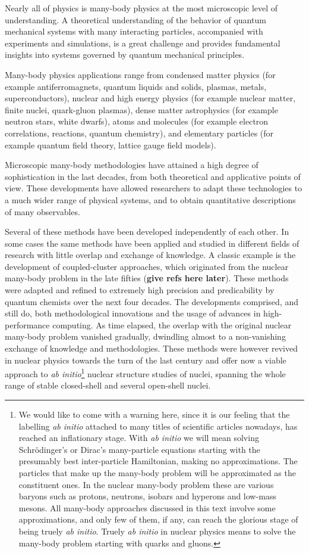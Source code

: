 
Nearly all of physics is many-body physics at the most  
microscopic level of understanding.
A theoretical understanding of the behavior of quantum mechanical systems with many interacting particles,
accompanied with experiments and simulations,   
is a  great challenge and provides fundamental insights into systems governed by quantum mechanical principles.

Many-body physics  applications range from condensed matter physics
(for example antiferromagnets, quantum liquids and solids, plasmas, metals,
superconductors), nuclear and high energy physics (for example nuclear matter, finite
nuclei, quark-gluon plasmas), dense matter astrophysics (for example  neutron
stars, white dwarfs), atoms and molecules (for example electron correlations,
reactions, quantum chemistry), and elementary particles
(for example quantum field theory, lattice gauge field models). 

Microscopic many-body methodologies have attained a high degree of
sophistication in the last decades, from both theoretical and
applicative  points of view. These developments have allowed
researchers to adapt these technologies to a much wider range of physical
systems, and to obtain quantitative descriptions of many 
observables. 

Several of these methods have been developed independently of each other.
In some  cases the same methods have been applied and studied in different
fields of research with little overlap and exchange of knowledge. 
A classic example is the development of coupled-cluster approaches,
which originated from the nuclear many-body problem in the late fifties ({\bf give refs here later}). 
These methods were adapted and refined 
to extremely high precision and predicability by quantum chemists over 
the next four decades. The developments comprised, and still do,  
both methodological innovations and the usage of advances in high-performance computing.    
As time elapsed,   
the overlap with the original nuclear many-body problem vanished gradually, 
dwindling almost to a non-vanishing exchange of knowledge and methodologies. 
These methods were however revived in nuclear physics towards the turn of the last century and offer now a viable approach
to {\em ab initio}\footnote{We would like to come with a warning here, since it is our feeling that the 
labelling {\em ab initio} attached to many titles of scientific articles nowadays, has reached an inflationary stage. 
With {\em ab initio} we will mean solving Schr\"odinger's or Dirac's many-particle equations starting with the presumably best 
inter-particle Hamiltonian, making no approximations. The particles that make up the many-body problem will be approximated 
as the constituent ones. 
In the nuclear many-body problem
these are various baryons such as protons, neutrons, isobars and hyperons and low-mass mesons. All many-body approaches discussed in this text involve
some approximations, and only few of them, if any,  can reach the glorious stage of being truely {\em ab initio}.
Truely {\em ab initio} in nuclear physics means to solve the many-body problem starting with quarks and gluons.}
nuclear structure  studies of nuclei,   spanning the whole range of stable closed-shell and several open-shell nuclei. 


